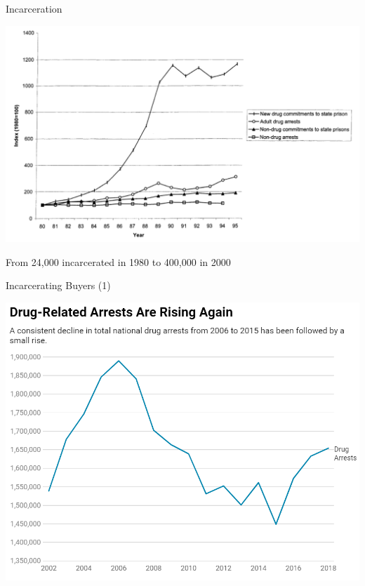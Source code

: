 \documentclass[10pt,ignorenonframetext,]{beamer}
\begin{document}
\begin{frame}{Incarceration}
\protect\hypertarget{incarceration}{}

\includegraphics{Figure2.png}

From 24,000 incarcerated in 1980 to 400,000 in 2000

\end{frame}

\begin{frame}{Incarcerating Buyers (1)}
\protect\hypertarget{incarcerating-buyers-1}{}

\includegraphics{Figure4.png}

\end{frame}
\end{document}
